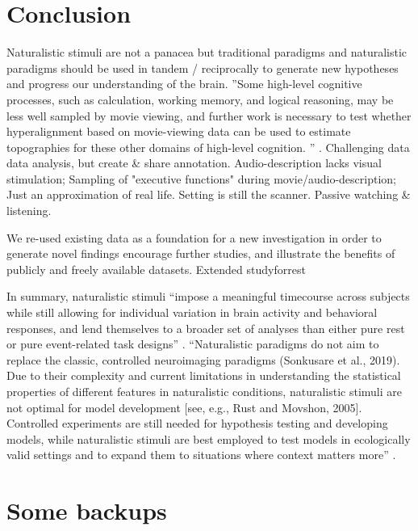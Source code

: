 \section{Conclusion}


%
Naturalistic stimuli are not a panacea but traditional paradigms and
naturalistic paradigms should be used in tandem / reciprocally to generate new
hypotheses and progress our understanding of the brain.
%
''Some high-level cognitive processes, such as calculation, working memory, and
logical reasoning, may be less well sampled by movie viewing, and further work
is necessary to test whether hyperalignment based on movie-viewing data can be
used to estimate topographies for these other domains of high-level cognition.
'' \citep{jiahui2020predicting}.
%
Challenging data data analysis, but create \& share annotation.
%
Audio-description lacks visual stimulation; Sampling of "executive functions"
during movie/audio-description;
%
Just an approximation of real life.
%
Setting is still the scanner.
%
Passive watching \& listening.

%
We re-used existing data as a foundation for a new investigation in
order to generate novel findings encourage further studies, and illustrate the
benefits of publicly and freely available datasets.
%
Extended studyforrest

%
In summary, naturalistic stimuli ``impose a meaningful timecourse across
subjects while still allowing for individual variation in brain activity and
behavioral responses, and lend themselves to a broader set of analyses than
either pure rest or pure event-related task designs'' \citep{finn2017can}.
%
``Naturalistic paradigms do not aim to replace the classic, controlled
neuroimaging paradigms (Sonkusare et al., 2019).
%
Due to their complexity and current limitations in understanding the statistical
properties of different features in naturalistic conditions, naturalistic
stimuli are not optimal for model development [see, e.g., Rust and Movshon,
2005].
%
Controlled experiments are still needed for hypothesis testing and developing
models, while naturalistic stimuli are best employed to test models in
ecologically valid settings and to expand them to situations where context
matters more'' \citep{saarimaki2021naturalistic}.




\section{Some backups}


